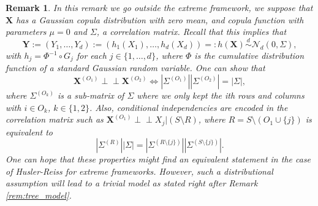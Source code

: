 \documentclass[11pt]{article}
\newtheorem{remark}{Remark}
\newcommand{\indep}{\perp \!\!\! \perp}
\begin{document}
	\begin{remark}
		 \label{rem:gaussian_copula}
		 In this remark we go outside the extreme framework, we suppose that $\textbf{X}$ has a Gaussian copula distribution with zero mean, and copula function with parameters $\mu = 0$ and $\Sigma$, a correlation matrix. Recall that this implies that
		 \begin{equation*}
		 	\textbf{Y} := (Y_1, \dots, Y_d) := (h_1(X_1), \dots, h_d(X_d)) =: h(\textbf{X}) \overset{d}{\sim} \mathcal{N}_d(0, \Sigma),
		 \end{equation*}
		 with $h_j = \Phi^{-1} \circ G_j$ for each $j \in \{1,\dots,d\}$, where $\Phi$ is the cumulative distribution function of a standard Gaussian random variable. One can show that
		 \begin{equation*}
		 	\textbf{X}^{(O_1)} \indep \textbf{X}^{(O_2)} \Longleftrightarrow  |\Sigma^{(O_1)}| |\Sigma^{(O_2)}| = |\Sigma|,
		 \end{equation*}
		 where $\Sigma^{(O_k)}$ is a sub-matrix of $\Sigma$ where we only kept the ith rows and columns with $i \in O_k$, $k \in \{1,2\}$. Also, conditional independencies are encoded in the correlation matrix such as $\textbf{X}^{(O_1)} \indep X_j | (S \setminus R)$, where $R = S \setminus (O_1 \cup \{j\})$ is equivalent to
		 \begin{equation*}
		 	|\Sigma^{(R)}| |\Sigma| = |\Sigma^{(R \setminus \{j\})}| |\Sigma^{(S \setminus \{j\})}|.
		 \end{equation*}
		 One can hope that these properties might find an equivalent statement in the case of Husler-Reiss for extreme frameworks. However, such a distributional assumption will lead to a trivial model as stated right after Remark \ref{rem:tree_model}.
	\end{remark}
	
\end{document}
